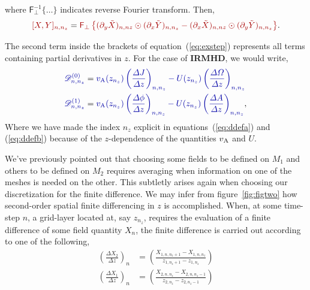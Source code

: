 \documentclass[12pt]{memoir}
\newcommand{\irmhd}{\textbf{IRMHD}}
\newcommand{\fftperp}{\mathsf{F}_\perp}
\newcommand{\dfield}{\mathscr{D}}
\begin{document}
%
where $\fftperp^{-1}\{\ldots\}$ indicates reverse Fourier
transform. Then,
%
\begin{equation}
  {\color{red!65!black}[X,Y]_{n,n_z}} = {\color{red!65!black}{\fftperp}
   \left\{   
             (\pardy \tilde X)_{n,nz} \odot (\pardx \tilde Y)_{n,n_z}
           - (\pardx \tilde X)_{n,nz} \odot (\pardy \tilde Y)_{n,n_z} 
  \right\}}.
\end{equation}
%
\par
%
The second term inside the brackets of equation~(\ref{eq:exstep})
represents all terms containing partial derivatives in $z$. For the
case of \irmhd, we would write,
%
\begin{subequations}
\begin{align}
%
  {\color{blue!65!black}\dfield^{(0)}_{n,n_z}} &= 
%
  {\color{blue!65!black}
     \magvalfven(z_{n_z})\left(\frac{\Delta  J}{\Delta z}\right)_{n,n_z} 
    - U(z_{n_z})\left(\frac{\Delta \Omega}{\Delta z}\right)_{n,n_z}
  } \label{eq:ddefa} \\
%
  {\color{blue!65!black}\dfield^{(1)}_{n,n_z}} &= 
%
  {\color{blue!65!black}
    \magvalfven(z_{n_z})\left(\frac{\Delta \phi}{\Delta z}\right)_{n,n_z}
   - U(z_{n_z})\left(\frac{\Delta A}{\Delta z}\right)_{n,n_z}
  },\label{eq:ddefb}
%
\end{align}
\end{subequations}
%
Where we have made the index $n_z$ explicit in equations~(\ref{eq:ddefa})
and (\ref{eq:ddefb}) because of the $z$-dependence of the quantities
$v_{\mathrm{A}}$ and $U$.
%
\par
%
We've previously pointed out that choosing some fields to be defined on
$M_1$ and others to be defined on $M_2$ requires averaging when information
on one of the meshes is needed on the other. This subtletly arises again
when choosing our discretization for the finite difference. We may infer
from figure~\ref{fig:figtwo} how second-order spatial finite differencing
in $z$ is accomplished. When, at some time-step $n$, a grid-layer located
at, say $z_{n_z}$, requires the evaluation of a finite difference of some
field quantity $X_n$, the finite difference is carried out according to
one of the following,
%
\begin{subequations}
\begin{eqnarray}
  \left(\frac{\Delta X_2}{\Delta z}\right)_n &= \left(\frac{X_{1,n,n_z+1} - X_{1,n,n_z  }}{z_{1,n_z+1}-z_{1,n_z  }}\right) 
  \label{eq:fda} \\
  \left(\frac{\Delta X_1}{\Delta z}\right)_n &= \left(\frac{X_{2,n,n_z}   - X_{2,n,n_z-1}}{z_{2,n_z}  -z_{2,n_z-1}}\right)
  \label{eq:fdb}
\end{eqnarray}
\end{subequations}
\end{document}
